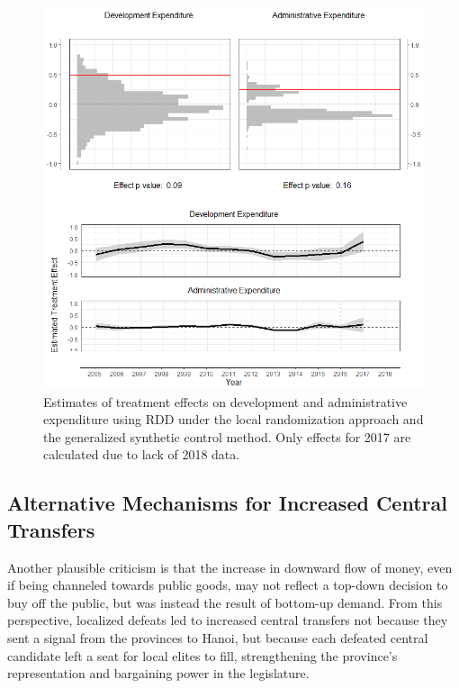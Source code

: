\documentclass[12pt]{article}
\newcommand{\1}{\mathbbm{1}}
\begin{document}
\begin{figure}[!htbp]
	\centering
	\includegraphics[width=\textwidth]{figure/190618_mech_results.png}
	\captionsetup{singlelinecheck=off}
	\caption[Estimated RDD and synthetic control treatment effects]{Estimates of treatment effects on development and administrative expenditure using RDD under the local randomization approach and the generalized synthetic control method. Only effects for 2017 are calculated due to lack of 2018 data.}
	\label{fig:synth_rdd_mech}
\end{figure}

\subsection{Alternative Mechanisms for Increased Central Transfers}

Another plausible criticism is that the increase in downward flow of money, even if being channeled towards public goods, may not reflect a top-down decision to buy off the public, but was instead the result of bottom-up demand. From this perspective, localized defeats led to increased central transfers not because they sent a signal from the provinces to Hanoi, but because each defeated central candidate left a seat for local elites to fill, strengthening the province's representation and bargaining power in the legislature.
\end{document}
